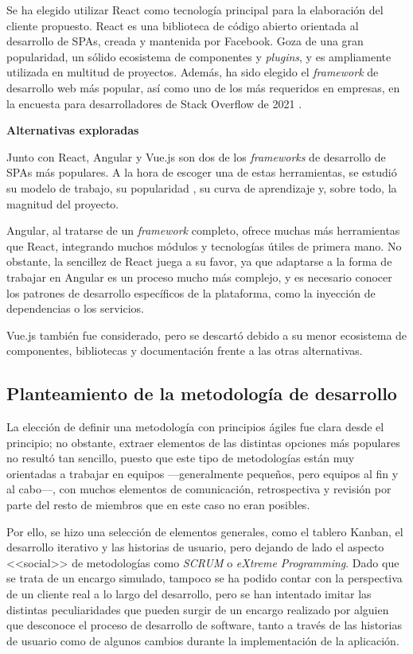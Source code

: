 \documentclass[10pt, a4paper]{aqademic}
\begin{document}
Se ha elegido utilizar React como tecnología principal para la elaboración del cliente propuesto. React es una biblioteca de código abierto orientada al desarrollo de
SPAs, creada y mantenida por Facebook. Goza de una gran popularidad, un sólido ecosistema de componentes y \textit{plugins}, y es ampliamente utilizada
en multitud de proyectos. Además, ha sido elegido el \textit{framework} de desarrollo web más popular, así como uno de los más requeridos en empresas, en la encuesta para desarrolladores de Stack Overflow de 2021 \cite{noauthor_stack_2021}.

\medskip

\textbf{Alternativas exploradas}

Junto con React, Angular y Vue.js son dos de los \textit{frameworks} de desarrollo de SPAs más populares. A la hora de escoger una de estas herramientas,
se estudió su modelo de trabajo, su popularidad \cite{potter_angular}, su curva de aprendizaje y, sobre todo, la magnitud del proyecto.

Angular, al tratarse de un \textit{framework} completo, ofrece muchas más herramientas que React, integrando muchos módulos y tecnologías útiles
de primera mano. No obstante, la sencillez de React juega a su favor, ya que adaptarse a la forma de trabajar en Angular es un proceso mucho más complejo,
y es necesario conocer los patrones de desarrollo específicos de la plataforma, como la inyección de dependencias o los servicios.

Vue.js también fue considerado, pero se descartó debido a su menor ecosistema de componentes, bibliotecas y documentación frente a las otras alternativas.


\subsection{Planteamiento de la metodología de desarrollo}

La elección de definir una metodología con principios ágiles fue clara desde el principio; no obstante, extraer elementos de las distintas opciones más populares no resultó tan sencillo, puesto que este tipo de metodologías están muy orientadas a trabajar en equipos ---generalmente pequeños, pero equipos al fin y al cabo---, con muchos elementos de comunicación, retrospectiva y revisión por parte del resto de miembros que en este caso no eran posibles.

Por ello, se hizo una selección de elementos generales, como el tablero Kanban, el desarrollo iterativo y las historias de usuario, pero dejando de lado el aspecto <<social>> de metodologías como \textit{SCRUM} o \textit{eXtreme Programming}. Dado que se trata de un encargo simulado, tampoco se ha podido contar con la perspectiva de un cliente real a lo largo del desarrollo, pero se han intentado imitar las distintas peculiaridades que pueden surgir de un encargo realizado por alguien que desconoce el proceso de desarrollo de software, tanto a través de las historias de usuario como de algunos cambios durante la implementación de la aplicación.
\end{document}
